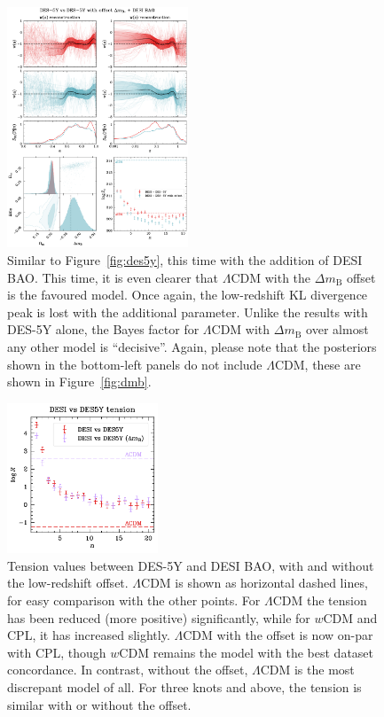 \documentclass[fleqn,usenatbib]{mnras}
\newcommand{\lcdm}{$\Lambda$CDM}
\newcommand{\dmb}{\ensuremath{\Delta m_\mathrm B}}
\begin{document}
    \begin{figure}
        \begin{center}
            \includegraphics[width=0.48\textwidth]{plots/desidr2_des5yoffset_20_wa.pdf}
        \end{center}
        \caption{
            Similar to Figure~\ref{fig:des5y}, this time with the addition of DESI BAO.
            This time, it is even clearer that \lcdm{} with the \dmb{} offset is the favoured model.
            Once again, the low-redshift KL divergence peak is lost with the additional parameter.
            Unlike the results with DES-5Y alone, the Bayes factor for \lcdm{} with \dmb{} over almost any other model is ``decisive''.
            Again, please note that the posteriors shown in the bottom-left panels do not include \lcdm{}, these are shown in Figure~\ref{fig:dmb}.
        }\label{fig:desidr2des5y}
    \end{figure}

    \begin{figure}
        \begin{center}
            \includegraphics[width=0.4\textwidth]{plots/tension.pdf}
        \end{center}
        \caption{
            Tension values between DES-5Y and DESI BAO, with and without the low-redshift offset.
            \lcdm{} is shown as horizontal dashed lines, for easy comparison with the other points.
            For \lcdm{} the tension has been reduced (more positive) significantly, while for $w$CDM and CPL, it has increased slightly.
            \lcdm{} with the offset is now on-par with CPL, though $w$CDM remains the model with the best dataset concordance.
            In contrast, without the offset, \lcdm{} is the most discrepant model of all.
            For three knots and above, the tension is similar with or without the offset.
        }\label{fig:tension}
    \end{figure}
\end{document}
